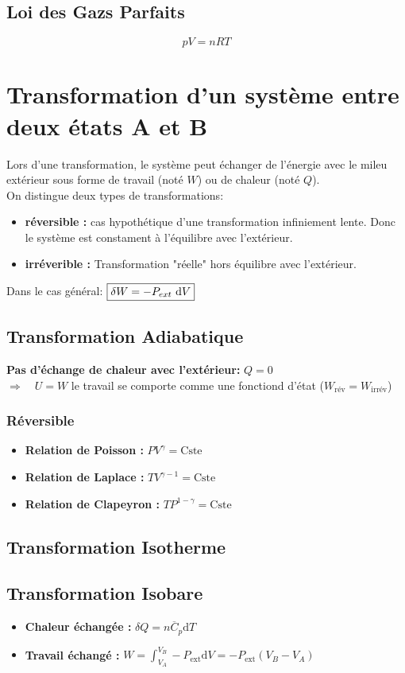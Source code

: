 \documentclass[a4paper,12pt]{article}
\newcommand{\diff}{\mathrm{d}} %
\newcommand{\re}{\textrm}
\newcommand{\Cp}{\overline{C}_p} %
\begin{document}
\subsection{Loi des Gazs Parfaits}
$$ \boxed{pV = nRT} $$

\section{Transformation d'un système entre deux états A et B}

Lors d'une transformation, le système peut échanger de l'énergie avec le mileu extérieur
sous forme de travail (noté $W$) ou de chaleur (noté $Q$).\\
On distingue deux types de transformations:
\begin{itemize}
    \item \textbf{réversible :} cas hypothétique d'une transformation infiniement lente. Donc le système est constament à l'équilibre avec l'extérieur.
    \item \textbf{irréverible :} Transformation "réelle" hors équilibre avec l'extérieur.
\end{itemize}


Dans le cas général: $ \boxed{\delta W = - P_{ext}\ \re d V} $

\subsection{Transformation Adiabatique}

\textbf{Pas d'échange de chaleur avec l'extérieur:} $\boxed{Q = 0}$\\ 
$\Longrightarrow \quad U = W$ \quad le travail se comporte comme une fonctiond d'état ($W_{\text{rév}} = W_{\text{irrév}}$)

\subsubsection{Réversible}

\begin{itemize}[label=\textbullet]
    \item \textbf{Relation de Poisson :} $PV^\gamma = \re{Cste}$
    \item \textbf{Relation de Laplace :} $T V^{\gamma - 1} = \re{Cste}$
    \item \textbf{Relation de Clapeyron :} $T P^{1 - \gamma} = \re{Cste}$
\end{itemize}

\subsection{Transformation Isotherme}


\subsection{Transformation Isobare}

\begin{itemize}[label=\textbullet]
    \item \textbf{Chaleur échangée :} $\delta Q = n \Cp \diff T$
    \item \textbf{Travail échangé :} $W = \int_{V_A}^{V_B}- P_{\text{ext}} \diff V = - P_{\text{ext}}(V_B-V_A)$
\end{itemize}
\end{document}
